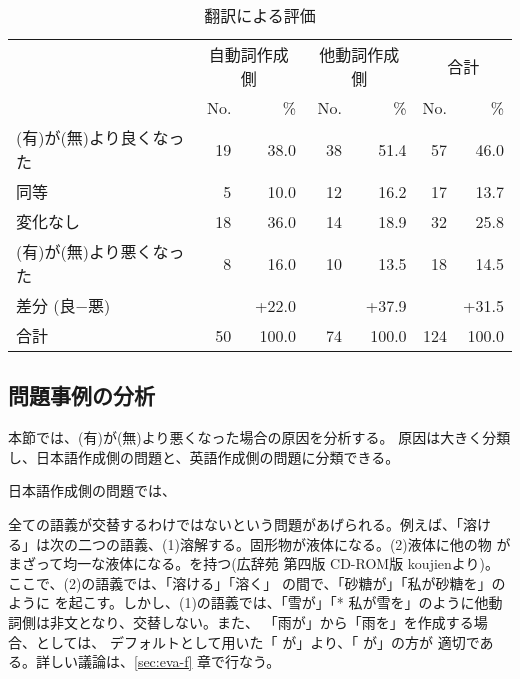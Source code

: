 \documentclass[japanese]{jnlp}
\newcommand{\izj}[1]{}
\newcommand{\abs}{}
\newcommand{\ul}[1]{}
\newcommand{\soalt}{}
\newcommand{\citep}{}
\def\mpt#1{}
\renewcommand{\mpt}[1]{}
\newcommand{\tot}{}
\begin{document}
\begin{table*}[htbp]
\begin{center}
\begin{tabular}{l|rr|rr|rr}
 & \multicolumn{2}{|c|}{自動詞作成側} 
 & \multicolumn{2}{|c|}{他動詞作成側}
 & \multicolumn{2}{|c}{合計}\\
 & No. & \%  & No. & \%  &  No. & \% \\
\hline
(有)が(無)より良くなった   & 19 & 38.0 & 38 & 51.4 & 57 & 46.0 \\
同等     & 5  & 10.0 & 12 & 16.2 & 17 & 13.7 \\
変化なし  & 18 & 36.0 & 14 & 18.9 & 32 & 25.8 \\
(有)が(無)より悪くなった   & 8 & 16.0  & 10 & 13.5 & 18 & 14.5 \\
\hline
差分 (良$-$悪)      &  & +22.0  &  & +37.9 &  & +31.5 \\
\hline
合計 & 50 & 100.0 & 74 & 100.0 & 124 & 100.0 \\
\end{tabular}
\caption{翻訳による評価}
\label{tb:eva-trans}
\end{center}
\end{table*}


\subsection{問題事例の分析}\label{sec:eva-lex}


本節では、(有)が(無)より悪くなった場合の原因を分析する。
原因は大きく分類し、日本語作成側の問題と、英語作成側の問題に分類できる。

日本語作成側の問題では、
\mpt{1.全ての語義が交替するわけではない}
全ての語義が交替するわけではないという問題があげられる。例えば、「溶け
る」は次の二つの語義、(1)溶解する。固形物が液体になる。(2)液体に他の物
がまざって均一な液体になる。を持つ(広辞苑 第四版 CD-ROM版
\citep{koujien}より)。ここで、(2)の語義では、「溶ける」\tot{}「溶く」
の間で、「砂糖が\ul{溶ける}」\tot{}「私が砂糖を\ul{溶く}」のように
\soalt{}を起こす。しかし、(1)の語義では、「雪が\ul{溶ける}」\tot{}「*
私が雪を\ul{溶く}」のように他動詞側は非文となり、交替しない。また、
「雨が\ul{降る}」から「雨を\ul{降らす}」を作成する場合、\abs{}としては、
デフォルトとして用いた「\izj{主体} が」より、「\izj{空 雲} が」の方が
適切である。詳しい議論は、\ref{sec:eva-f} 章で行なう。

\mpt{交替する語義か交替しない語義かのふるい分けをどうすべきか？}
\end{document}
